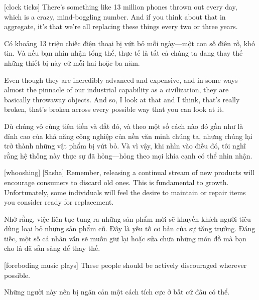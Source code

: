 \documentclass[a4paper]{article}
\begin{document}
	[clock ticks]
	There's something like 13 million phones thrown out every day, which is a crazy, mind-boggling number. And if you think about that in aggregate, it's that we're all replacing these things every two or three years.
	
	\begin{vietnamese-v2}
		 Có khoảng 13 triệu chiếc điện thoại bị vứt bỏ mỗi ngày—một con số điên rồ, khó tin. Và nếu bạn nhìn nhận tổng thể, thực tế là tất cả chúng ta đang thay thế những thiết bị này cứ mỗi hai hoặc ba năm.
	\end{vietnamese-v2}
	
	Even though they are incredibly advanced and expensive, and in some ways almost the pinnacle of our industrial capability as a civilization, they are basically throwaway objects.
	And so, I look at that and I think, that's really broken, that's broken across every possible way that you can look at it.
	
	\begin{vietnamese-v2}
		Dù chúng vô cùng tiên tiến và đắt đỏ, và theo một số cách nào đó gần như là đỉnh cao của khả năng công nghiệp của nền văn minh chúng ta, nhưng chúng lại trở thành những vật phẩm bị vứt bỏ. Và vì vậy, khi nhìn vào điều đó, tôi nghĩ rằng hệ thống này thực sự đã hỏng—hỏng theo mọi khía cạnh có thể nhìn nhận.
	\end{vietnamese-v2}
	
	[whooshing]
	[Sasha] Remember, releasing a continual stream of new products will encourage consumers to discard old ones.
	This is fundamental to growth. Unfortunately, some individuals will feel the desire to maintain or repair items you consider ready for replacement.
	
	\begin{vietnamese-v2}
		 Nhớ rằng, việc liên tục tung ra những sản phẩm mới sẽ khuyến khích người tiêu dùng loại bỏ những sản phẩm cũ. Đây là yếu tố cơ bản của sự tăng trưởng. Đáng tiếc, một số cá nhân vẫn sẽ muốn giữ lại hoặc sửa chữa những món đồ mà bạn cho là đã sẵn sàng để thay thế.
	\end{vietnamese-v2}
	
	
	[foreboding music plays]
	These people should be actively discouraged wherever possible.
	
	\begin{vietnamese-v2}
		 Những người này nên bị ngăn cản một cách tích cực ở bất cứ đâu có thể.
	\end{vietnamese-v2}
	
\end{document}
